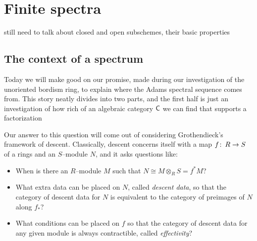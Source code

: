 
\chapter{Finite spectra}\label{ChapterFiniteSpectra}





still need to talk about closed and open subschemes, their basic properties



\section{The context of a spectrum}\label{StableContextLecture}

Today we will make good on our promise, made during our investigation of the unoriented bordism ring, to explain where the Adams spectral sequence comes from.  This story neatly divides into two parts, and the first half is just an investigation of how rich of an algebraic category $\mathsf{C}$ we can find that supports a factorization
\begin{center}
\end{center}
Our answer to this question will come out of considering Grothendieck's framework of descent.  Classically, descent concerns itself with a map $f\colon\thinspace R \to S$ of a rings and an $S$--module $N$, and it asks questions like:
\begin{itemize}
\item When is there an $R$--module $M$ such that $N \cong M \otimes_R S = f^* M$?
\item What extra data can be placed on $N$, called \textit{descent data}, so that the category of descent data for $N$ is equivalent to the category of preimages of $N$ along $f_*$?
\item What conditions can be placed on $f$ so that the category of descent data for any given module is always contractible, called \textit{effectivity}?
\end{itemize}

